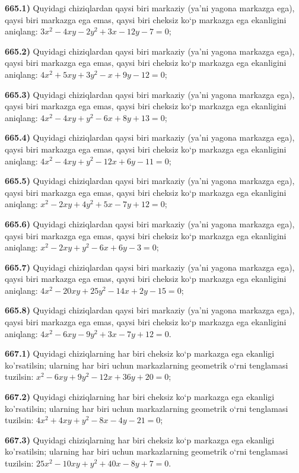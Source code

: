 \textbf{665.1)} Quyidagi chiziqlardan qaysi biri markaziy (ya’ni yagona markazga ega), qaysi biri markazga ega emas, qaysi biri cheksiz ko‘p markazga ega ekanligini aniqlang: $3 x^2-4 x y-2 y^2+3 x-12 y-7=0$;

\textbf{665.2)} Quyidagi chiziqlardan qaysi biri markaziy (ya’ni yagona markazga ega), qaysi biri markazga ega emas, qaysi biri cheksiz ko‘p markazga ega ekanligini aniqlang: $4 x^2+5 x y+3 y^2-x+9 y-12=0$;

\textbf{665.3)} Quyidagi chiziqlardan qaysi biri markaziy (ya’ni yagona markazga ega), qaysi biri markazga ega emas, qaysi biri cheksiz ko‘p markazga ega ekanligini aniqlang: $4 x^2-4 x y+y^2-6 x+8 y+13=0$;

\textbf{665.4)} Quyidagi chiziqlardan qaysi biri markaziy (ya’ni yagona markazga ega), qaysi biri markazga ega emas, qaysi biri cheksiz ko‘p markazga ega ekanligini aniqlang: $4 x^2-4 x y+y^2-12 x+6 y-11=0$;

\textbf{665.5)} Quyidagi chiziqlardan qaysi biri markaziy (ya’ni yagona markazga ega), qaysi biri markazga ega emas, qaysi biri cheksiz ko‘p markazga ega ekanligini aniqlang: $x^2-2 x y+4 y^2+5 x-7 y+12=0$;

\textbf{665.6)} Quyidagi chiziqlardan qaysi biri markaziy (ya’ni yagona markazga ega), qaysi biri markazga ega emas, qaysi biri cheksiz ko‘p markazga ega ekanligini aniqlang: $x^2-2 x y+y^2-6 x+6 y-3=0$;

\textbf{665.7)} Quyidagi chiziqlardan qaysi biri markaziy (ya’ni yagona markazga ega), qaysi biri markazga ega emas, qaysi biri cheksiz ko‘p markazga ega ekanligini aniqlang: $4 x^2-20 x y+25 y^2-14 x+2 y-15=0$;

\textbf{665.8)} Quyidagi chiziqlardan qaysi biri markaziy (ya’ni yagona markazga ega), qaysi biri markazga ega emas, qaysi biri cheksiz ko‘p markazga ega ekanligini aniqlang: $4 x^2-6 x y-9 y^2+3 x-7 y+12=0$.

\textbf{667.1)} Quyidagi chiziqlarning har biri cheksiz ko‘p markazga ega ekanligi ko'rsatilsin; ularning har biri uchun markazlarning geometrik o‘rni tenglamasi tuzilsin: $x^2-6 x y+9 y^2-12 x+36 y+20=0$;

\textbf{667.2)} Quyidagi chiziqlarning har biri cheksiz ko‘p markazga ega ekanligi ko'rsatilsin; ularning har biri uchun markazlarning geometrik o‘rni tenglamasi tuzilsin: $4 x^2+4 x y+y^2-8 x-4 y-21=0$;

\textbf{667.3)} Quyidagi chiziqlarning har biri cheksiz ko‘p markazga ega ekanligi ko'rsatilsin; ularning har biri uchun markazlarning geometrik o‘rni tenglamasi tuzilsin: $25 x^2-10 x y+y^2+40 x-8 y+7=0$.



